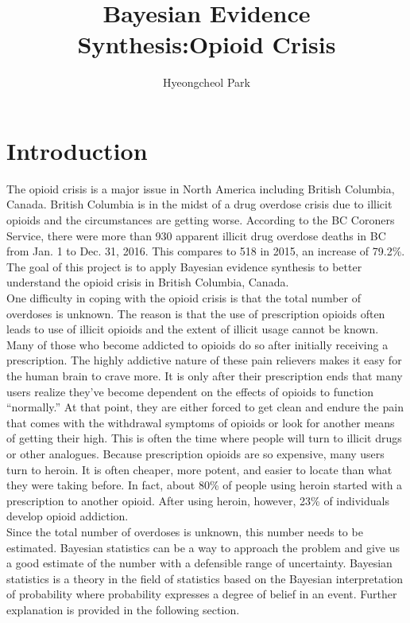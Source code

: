 \documentclass[12pt]{article}
\title{Bayesian Evidence Synthesis:Opioid Crisis}
\author{Hyeongcheol Park}
\begin{document}
 \maketitle{}
\tableofcontents %
\listoffigures %
\listoftables %
\doublespacing

\section{Introduction}
The opioid crisis is a major issue in North America including British Columbia, Canada. British Columbia is in the midst of a drug overdose crisis due to illicit opioids and the circumstances are getting worse. According to the BC Coroners Service, there were more than 930 apparent illicit drug overdose deaths in BC from Jan. 1 to Dec. 31, 2016. This compares to 518 in 2015, an increase of 79.2\%. \cite{bccdc_opioid}  The goal of this project is to apply Bayesian evidence synthesis to better understand the opioid crisis in British Columbia, Canada.  \\ 

One difficulty in coping with the opioid crisis is that the total number of overdoses is unknown. The reason is that the use of prescription opioids often leads to use of illicit opioids and the extent of illicit usage cannot be known. Many of those who become addicted to opioids do so after initially receiving a prescription. The highly addictive nature of these pain relievers makes it easy for the human brain to crave more. It is only after their prescription ends that many users realize they’ve become dependent on the effects of opioids  to function “normally.” At that point, they are either forced to get clean and endure the pain that comes with the withdrawal symptoms of opioids or look for another means of getting their high. This is often the time where people will turn to illicit drugs or other analogues. Because prescription opioids are so expensive,  many users turn to heroin. It is often cheaper, more potent, and easier to locate than what they were taking before. In fact, about 80\% of people using heroin started with a prescription to another opioid. After using heroin, however, 23\% of individuals develop opioid addiction.\cite{opioid_desc} \\

Since the total number of overdoses is unknown, this number needs to be estimated. Bayesian statistics can be a way to approach the problem and give us a good estimate of the number with a defensible range of uncertainty. Bayesian statistics is a theory in the field of statistics based on the Bayesian interpretation of probability where probability expresses a degree of belief in an event. \cite{wiki_bayes} Further explanation is provided in the following section.\\
\end{document}
